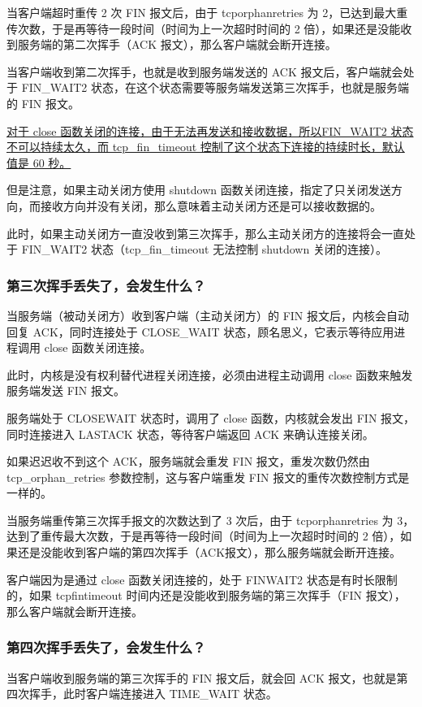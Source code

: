 \documentclass[11pt]{article}
\begin{document}
当客户端超时重传 2 次 FIN 报文后，由于 tcporphanretries 为 2，已达到最大重传次数，于是再等待一段时间（时间为上一次超时时间的 2 倍），如果还是没能收到服务端的第二次挥手（ACK 报文），那么客户端就会断开连接。

当客户端收到第二次挥手，也就是收到服务端发送的 ACK 报文后，客户端就会处于 FIN\_WAIT2 状态，在这个状态需要等服务端发送第三次挥手，也就是服务端的 FIN 报文。

\uline{对于 close 函数关闭的连接，由于无法再发送和接收数据，所以FIN\_WAIT2 状态不可以持续太久，而 tcp\_fin\_timeout 控制了这个状态下连接的持续时长，默认值是 60 秒。}

但是注意，如果主动关闭方使用 shutdown 函数关闭连接，指定了只关闭发送方向，而接收方向并没有关闭，那么意味着主动关闭方还是可以接收数据的。

此时，如果主动关闭方一直没收到第三次挥手，那么主动关闭方的连接将会一直处于 FIN\_WAIT2 状态（tcp\_fin\_timeout 无法控制 shutdown 关闭的连接）。

\subsubsection{第三次挥手丢失了，会发生什么？}
\label{sec:org7364c66}
当服务端（被动关闭方）收到客户端（主动关闭方）的 FIN 报文后，内核会自动回复 ACK，同时连接处于 CLOSE\_WAIT 状态，顾名思义，它表示等待应用进程调用 close 函数关闭连接。

此时，内核是没有权利替代进程关闭连接，必须由进程主动调用 close 函数来触发服务端发送 FIN 报文。

服务端处于 CLOSEWAIT 状态时，调用了 close 函数，内核就会发出 FIN 报文，同时连接进入 LASTACK 状态，等待客户端返回 ACK 来确认连接关闭。

如果迟迟收不到这个 ACK，服务端就会重发 FIN 报文，重发次数仍然由 tcp\_orphan\_retries 参数控制，这与客户端重发 FIN 报文的重传次数控制方式是一样的。

当服务端重传第三次挥手报文的次数达到了 3 次后，由于 tcporphanretries 为 3，达到了重传最大次数，于是再等待一段时间（时间为上一次超时时间的 2 倍），如果还是没能收到客户端的第四次挥手（ACK报文），那么服务端就会断开连接。

客户端因为是通过 close 函数关闭连接的，处于 FINWAIT2 状态是有时长限制的，如果 tcpfintimeout 时间内还是没能收到服务端的第三次挥手（FIN 报文），那么客户端就会断开连接。

\subsubsection{第四次挥手丢失了，会发生什么？}
\label{sec:orgba73bff}
当客户端收到服务端的第三次挥手的 FIN 报文后，就会回 ACK 报文，也就是第四次挥手，此时客户端连接进入 TIME\_WAIT 状态。
\end{document}
